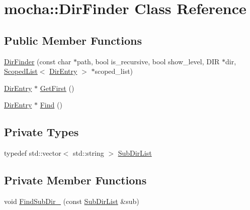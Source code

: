 \hypertarget{classmocha_1_1_dir_finder}{
\section{mocha::DirFinder Class Reference}
\label{classmocha_1_1_dir_finder}
}
\subsection*{Public Member Functions}
\begin{DoxyCompactItemize}
\item 
\hyperlink{classmocha_1_1_dir_finder_a811d9e60e339b262a1a3aa75788a5673}{DirFinder} (const char $\ast$path, bool is\_\-recursive, bool show\_\-level, DIR $\ast$dir, \hyperlink{classmocha_1_1_scoped_list}{ScopedList}$<$ \hyperlink{classmocha_1_1_dir_entry}{DirEntry} $>$ $\ast$scoped\_\-list)
\item 
\hyperlink{classmocha_1_1_dir_entry}{DirEntry} $\ast$ \hyperlink{classmocha_1_1_dir_finder_a02fbbcd307ade283ff9cf0fa290dd697}{GetFirst} ()
\item 
\hyperlink{classmocha_1_1_dir_entry}{DirEntry} $\ast$ \hyperlink{classmocha_1_1_dir_finder_a63276dd45352800c62f033a534931e30}{Find} ()
\end{DoxyCompactItemize}
\subsection*{Private Types}
\begin{DoxyCompactItemize}
\item 
typedef std::vector$<$ std::string $>$ \hyperlink{classmocha_1_1_dir_finder_abd8c8f76dbb9c9ac8a3810d99a9f10e8}{SubDirList}
\end{DoxyCompactItemize}
\subsection*{Private Member Functions}
\begin{DoxyCompactItemize}
\item 
void \hyperlink{classmocha_1_1_dir_finder_ad94fab153c96ce00314d97f8ca8f8798}{FindSubDir\_\-} (const \hyperlink{classmocha_1_1_dir_finder_abd8c8f76dbb9c9ac8a3810d99a9f10e8}{SubDirList} \&sub)
\end{DoxyCompactItemize}
